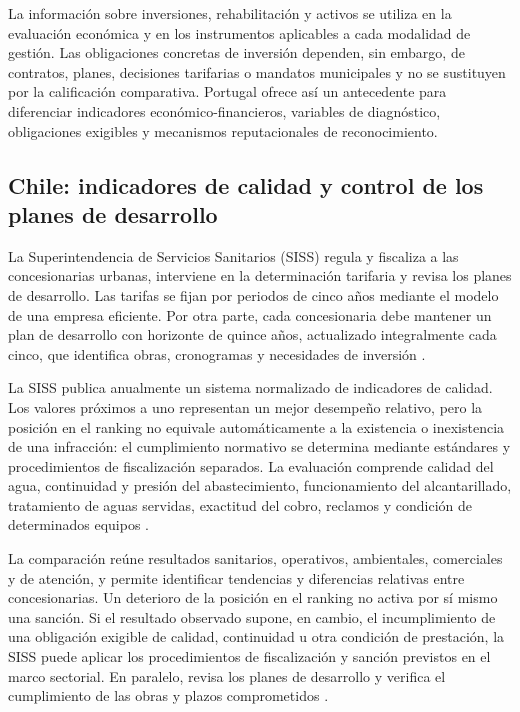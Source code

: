 La información sobre inversiones, rehabilitación y activos se utiliza en la evaluación económica y en los instrumentos aplicables a cada modalidad de gestión. Las obligaciones concretas de inversión dependen, sin embargo, de contratos, planes, decisiones tarifarias o mandatos municipales y no se sustituyen por la calificación comparativa. Portugal ofrece así un antecedente para diferenciar indicadores económico-financieros, variables de diagnóstico, obligaciones exigibles y mecanismos reputacionales de reconocimiento.

\subsection{Chile: indicadores de calidad y control de los planes de desarrollo}
\label{anexo:chile}

La Superintendencia de Servicios Sanitarios (SISS) regula y fiscaliza a las concesionarias urbanas, interviene en la determinación tarifaria y revisa los planes de desarrollo. Las tarifas se fijan por periodos de cinco años mediante el modelo de una empresa eficiente. Por otra parte, cada concesionaria debe mantener un plan de desarrollo con horizonte de quince años, actualizado integralmente cada cinco, que identifica obras, cronogramas y necesidades de inversión \citep{ChileDFL70,ChileDFL382,SISS2016GuiaPlanes,SISSModeloTarifario}.

La SISS publica anualmente un sistema normalizado de indicadores de calidad. Los valores próximos a uno representan un mejor desempeño relativo, pero la posición en el ranking no equivale automáticamente a la existencia o inexistencia de una infracción: el cumplimiento normativo se determina mediante estándares y procedimientos de fiscalización separados. La evaluación comprende calidad del agua, continuidad y presión del abastecimiento, funcionamiento del alcantarillado, tratamiento de aguas servidas, exactitud del cobro, reclamos y condición de determinados equipos \citep{SISSIndicadoresCalidad,SISS2025Sector}.

La comparación reúne resultados sanitarios, operativos, ambientales, comerciales y de atención, y permite identificar tendencias y diferencias relativas entre concesionarias. Un deterioro de la posición en el ranking no activa por sí mismo una sanción. Si el resultado observado supone, en cambio, el incumplimiento de una obligación exigible de calidad, continuidad u otra condición de prestación, la SISS puede aplicar los procedimientos de fiscalización y sanción previstos en el marco sectorial. En paralelo, revisa los planes de desarrollo y verifica el cumplimiento de las obras y plazos comprometidos \citep{ChileDFL382,SISSIndicadoresCalidad,SISS2025Sector}.


